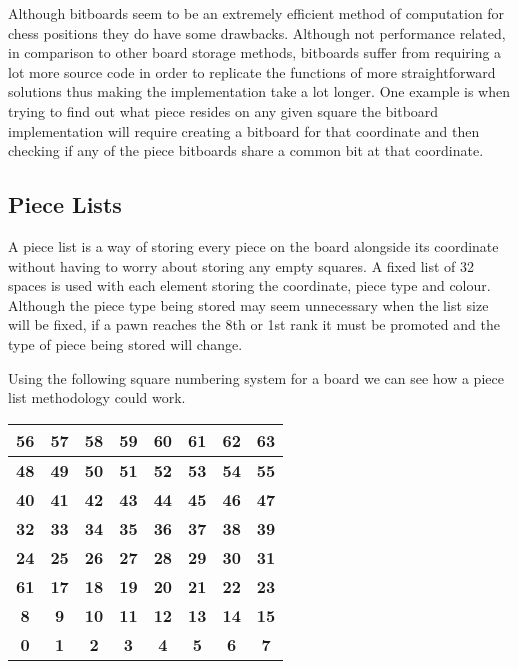 \documentclass[11pt]{report}
\begin{document}
Although bitboards seem to be an extremely efficient method of computation for chess positions they do have some drawbacks. Although not performance related, in comparison to other board storage methods, bitboards suffer from requiring a lot more source code in order to replicate the functions of more straightforward solutions thus making the implementation take a lot longer. One example is when trying to find out what piece resides on any given square the bitboard implementation will require creating a bitboard for that coordinate and then checking if any of the piece bitboards share a common bit at that coordinate. \newline

\subsection{Piece Lists}

A piece list is a way of storing every piece on the board alongside its coordinate without having to worry about storing any empty squares. A fixed list of 32 spaces is used with each element storing the coordinate, piece type and colour. Although the piece type being stored may seem unnecessary when the list size will be fixed, if a pawn reaches the 8th or 1st rank it must be promoted and the type of piece being stored will change. \newline

Using the following square numbering system for a board we can see how a piece list methodology could work.

\begin{table}[H]
\centering
\begin{tabular}{|c|c|c|c|c|c|c|c|}
\hline
\textbf{56} & \textbf{57} & \textbf{58} & \textbf{59} & \textbf{60} & \textbf{61} & \textbf{62} & \textbf{63} \\ \hline
\textbf{48} & \textbf{49} & \textbf{50} & \textbf{51} & \textbf{52} & \textbf{53} & \textbf{54} & \textbf{55} \\ \hline
\textbf{40} & \textbf{41} & \textbf{42} & \textbf{43} & \textbf{44} & \textbf{45} & \textbf{46} & \textbf{47} \\ \hline
\textbf{32} & \textbf{33} & \textbf{34} & \textbf{35} & \textbf{36} & \textbf{37} & \textbf{38} & \textbf{39} \\ \hline
\textbf{24} & \textbf{25} & \textbf{26} & \textbf{27} & \textbf{28} & \textbf{29} & \textbf{30} & \textbf{31} \\ \hline
\textbf{61} & \textbf{17} & \textbf{18} & \textbf{19} & \textbf{20} & \textbf{21} & \textbf{22} & \textbf{23} \\ \hline
\textbf{8}  & \textbf{9}  & \textbf{10} & \textbf{11} & \textbf{12} & \textbf{13} & \textbf{14} & \textbf{15} \\ \hline
\textbf{0}  & \textbf{1}  & \textbf{2}  & \textbf{3}  & \textbf{4}  & \textbf{5}  & \textbf{6}  & \textbf{7}  \\ \hline
\end{tabular}
\end{table}
\end{document}
